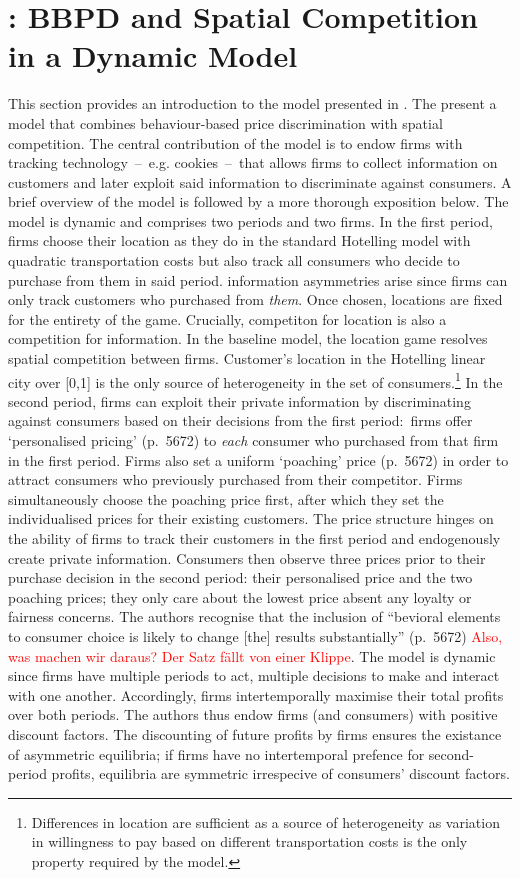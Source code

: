 \documentclass[a4paper, 11 pt, fleqn]{article}
\begin{document}
\section{\citet{Choe.2018}: BBPD and Spatial Competition in a Dynamic Model} \label{sec:choe-2018-intro}
%
This section provides an introduction to the model presented in \citet{Choe.2018}. The present a model that combines
behaviour-based price discrimination with spatial competition. The central contribution of the model is to endow firms
with tracking technology~--~e.g. cookies~--~that allows firms to collect information on customers and later exploit said
information to discriminate against consumers. A brief overview of the model is followed by a more thorough
exposition below. The model is dynamic and comprises two periods and two firms.
In the first period, firms choose their location as they do in the standard Hotelling model with quadratic transportation costs
but also track all consumers who decide to purchase from them in said period. information asymmetries arise since
firms can only track customers who purchased from \textit{them}. Once chosen, locations are fixed for the entirety of the
game. Crucially, competiton for location is also a competition for information. In the baseline model, the location game resolves
spatial competition between firms. Customer's location in the Hotelling linear city over [0,1] is the only source of heterogeneity
in the set of consumers.\footnote{Differences in location are sufficient as a source of heterogeneity as variation in willingness to pay based on different
transportation costs is the only property required by the model.} In the second period, firms can exploit their private information by
discriminating against consumers based on their decisions from the first period:~firms offer `personalised pricing' (p.~5672) to
\textit{each} consumer who purchased from that firm in the first period. Firms also set a uniform `poaching' price (p.~5672) in
order to attract consumers who previously purchased from their competitor. Firms simultaneously choose the poaching price first,
after which they set the individualised prices for their existing customers. The price structure hinges on the ability of firms
to track their customers in the first period and endogenously create private information. Consumers then observe three prices
prior to their purchase decision in the second period: their personalised price and the two poaching prices; they only care about
the lowest price absent any loyalty or fairness concerns. The authors recognise that the inclusion of ``bevioral elements to consumer
choice is likely to change [the] results substantially'' (p.~5672) \textcolor{red}{Also, was machen wir daraus? Der Satz fällt von einer Klippe}. The model is dynamic since firms have multiple periods to act,
multiple decisions to make and interact with one another. Accordingly, firms intertemporally maximise their total profits over both
periods. The authors thus endow firms (and consumers) with positive discount factors. The discounting of future profits by firms
ensures the existance of asymmetric equilibria; if firms have no intertemporal prefence for second-period profits, equilibria are
symmetric irrespecive of consumers' discount factors.
%
\end{document}
